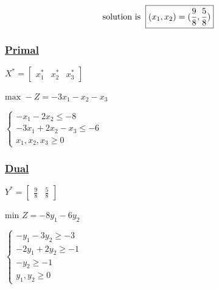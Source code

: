 \[\text{solution is} \hspace{0.2cm}\boxed{(x_1,x_2)=(\frac{9}{8},\frac{5}{8})}\]

\begin{minipage}{0.45\textwidth}

\vspace{-1.1cm}
\subsubsection*{\underline{Primal}}
\(X^{*} = \left[\begin{matrix} x^{*}_{1} & x^{*}_{2} & x^{*}_{3}  \end{matrix}\right]\)

\vspace{0.45cm}

\(\text{max } -Z = -3x_1 - x_2 - x_3\)

\vspace{0.45cm}
\(
\left\{
\begin{array}{l}
    -x_{1} - 2x_{2}  \leq -8 \\
    -3x_{1} + 2x_{2} - x_{3} \leq -6 \\
    x_{1}, x_{2}, x_{3}\geq 0
\end{array}
\right.
\)
\end{minipage}
\hfill
\begin{minipage}{0.45\textwidth}

\vspace{-0.3cm}
\subsubsection*{\underline{Dual}}
\(Y^{*} = \left[\begin{matrix} \frac{9}{8} & \frac{5}{8} \end{matrix}\right]\)

\vspace{0.45cm}
\(\text{min } Z = -8y_1 - 6y_2 \)

\vspace{0.45cm}

\(
\left\{
\begin{array}{l}
    -y_{1} - 3y_{2} \geq -3 \\
    -2y_{1} + 2y_{2}  \geq -1 \\
     -y_{2}  \geq -1 \\
    y_{1}, y_{2}\geq 0
\end{array}
\right.
\)
\end{minipage}

\vspace{1.5cm}

